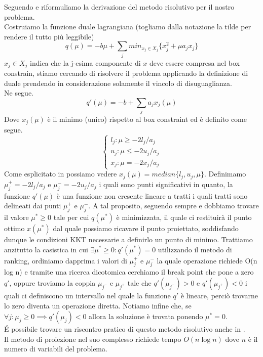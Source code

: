 \documentclass[12pt]{extarticle}
\begin{document}
Seguendo \cite{Jeong2014IndefiniteKS} e \cite{PATRIKSSON20081} riformuliamo la derivazione del metodo risolutivo per il nostro problema.\\
Costruiamo la funzione duale lagrangiana (togliamo dalla notazione la tilde per rendere il tutto più leggibile)
\[q(\mu) = -b\mu + \sum_j { min_{x_j \in X_j} \{x_j^2 + \mu a_j x_j\}}\]
$x_j \in X_j$ indica che la j-esima componente di $x$ deve essere compresa nel box constrain, stiamo cercando di risolvere il problema applicando la definizione di duale prendendo in considerazione solamente il vincolo di disuguaglianza.\\
Ne segue.
\[q'(\mu) = -b + \sum_j { a_j x_j(\mu)}\]
Dove $x_j(\mu)$ è il minimo (unico) rispetto al box constraint ed è definito come segue.
\begin{equation}
    \begin{cases}
      l_j : \mu \geq -2l_j/a_j\\
      u_j : \mu \leq -2u_j/a_j\\
      x_j : \mu = -2x_j/a_j
    \end{cases}
\end{equation}
Come esplicitato in \cite{Jeong2014IndefiniteKS} possiamo vedere $x_j(\mu) = median \{l_j, u_j, \mu\}$. Definimamo $\mu_j^+ = -2l_j/a_j$ e $\mu_j^- = -2u_j/a_j$ i quali sono punti significativi in quanto, la funzione $q'(\mu)$ è una funzione non cresente lineare a tratti i quali tratti sono delineati dai punti $\mu_j^+$ e $\mu_j^-$. A tal proposito, seguendo sempre \cite{Jeong2014IndefiniteKS} e \cite{PATRIKSSON20081} dobbiamo trovare il valore $\mu^* \geq 0$ tale per cui $q(\mu^*)$ è minimizzata, il quale ci restituirà il punto ottimo $x(\mu^*)$ dal quale possiamo ricavare il punto proiettato, soddisfando dunque le condizioni KKT necessarie a definirlo un punto di minimo. Trattiamo anzitutto la casistica in cui $\exists \mu^* \geq 0 : q'(\mu^*) = 0$ utilizzando il metodo di ranking, ordiniamo dapprima i valori di $\mu_j^+$ e $\mu_j^-$ la quale operazione richiede O(n log n) e tramite una ricerca dicotomica cerchiamo il break point che pone a zero $q'$, oppure troviamo la coppia $\mu_{j^-}$ e $\mu_{j^+}$ tale che $q'(\mu_{j^-}) > 0$ e $q'(\mu_{j^+}) < 0$ i quali ci definiscono un intervallo nel quale la funzione $q'$ è lineare, perciò trovarne lo zero diventa un operazione diretta. Notiamo infine che, se $\forall j : \mu_j \geq 0 \implies q'(\mu_j) < 0$ allora la soluzione è trovata ponendo $\mu^*  = 0$.\\
\'E possibile trovare un riscontro pratico di questo metodo risolutivo anche in \cite{bretthauer1995nonlinear}.\\
Il metodo di proiezione nel suo complesso richiede tempo $O(n \log n)$ dove $n$ è il numero di variabili del problema.
\end{document}
